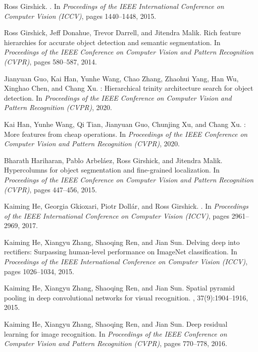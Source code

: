 \documentclass[10pt,twocolumn,letterpaper]{article}
\begin{document}
{\begin{thebibliography}{100}
	Ross Girshick.
	.
	\newblock In {\em Proceedings of the IEEE International Conference on Computer
		Vision (ICCV)}, pages 1440--1448, 2015.
	
	Ross Girshick, Jeff Donahue, Trevor Darrell, and Jitendra Malik.
	\newblock Rich feature hierarchies for accurate object detection and semantic
	segmentation.
	\newblock In {\em Proceedings of the IEEE Conference on Computer Vision and
		Pattern Recognition (CVPR)}, pages 580--587, 2014.
	
	Jianyuan Guo, Kai Han, Yunhe Wang, Chao Zhang, Zhaohui Yang, Han Wu, Xinghao
	Chen, and Chang Xu.
	: Hierarchical trinity architecture search for object
	detection.
	\newblock In {\em Proceedings of the IEEE Conference on Computer Vision and
		Pattern Recognition (CVPR)}, 2020.
	
	Kai Han, Yunhe Wang, Qi Tian, Jianyuan Guo, Chunjing Xu, and Chang Xu.
	: More features from cheap operations.
	\newblock In {\em Proceedings of the IEEE Conference on Computer Vision and
		Pattern Recognition (CVPR)}, 2020.
	
	Bharath Hariharan, Pablo Arbel{\'a}ez, Ross Girshick, and Jitendra Malik.
	\newblock Hypercolumns for object segmentation and fine-grained localization.
	\newblock In {\em Proceedings of the IEEE Conference on Computer Vision and
		Pattern Recognition (CVPR)}, pages 447--456, 2015.
	
	Kaiming He, Georgia Gkioxari, Piotr Doll{\'a}r, and Ross Girshick.
	.
	\newblock In {\em Proceedings of the IEEE International Conference on Computer
		Vision (ICCV)}, pages 2961--2969, 2017.
	
	Kaiming He, Xiangyu Zhang, Shaoqing Ren, and Jian Sun.
	\newblock Delving deep into rectifiers: Surpassing human-level performance on
	{ImageNet} classification.
	\newblock In {\em Proceedings of the IEEE International Conference on Computer
		Vision (ICCV)}, pages 1026--1034, 2015.
	
	Kaiming He, Xiangyu Zhang, Shaoqing Ren, and Jian Sun.
	\newblock Spatial pyramid pooling in deep convolutional networks for visual
	recognition.
	, 37(9):1904--1916, 2015.
	
	Kaiming He, Xiangyu Zhang, Shaoqing Ren, and Jian Sun.
	\newblock Deep residual learning for image recognition.
	\newblock In {\em Proceedings of the IEEE Conference on Computer Vision and
		Pattern Recognition (CVPR)}, pages 770--778, 2016.
	

\end{thebibliography}}
\end{document}
